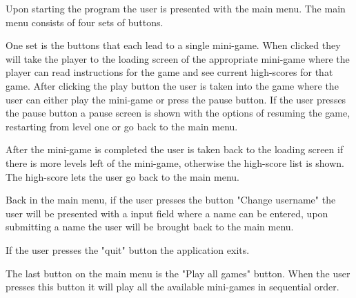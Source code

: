 Upon starting the program the user is presented with the main menu.
The main menu consists of four sets of buttons.

One set is the buttons that each lead to a single mini-game. 
When clicked they will take the player to the loading screen of the appropriate mini-game where the player can read instructions for the game and see current high-scores for that game.
After clicking the play button the user is taken into the game where the user can either play the mini-game or press the pause button.
If the user presses the pause button a pause screen is shown with the options of resuming the game, restarting from level one or go back to the main menu.

After the mini-game is completed the user is taken back to the loading screen if there is more levels left of the mini-game, otherwise the high-score list is shown.
The high-score lets the user go back to the main menu.

Back in the main menu, if the user presses the button "Change username" the user will be presented with a input field where a name can be entered, upon submitting a name the user will be brought back to the main menu.

If the user presses the "quit" button the application exits.

The last button on the main menu is the "Play all games" button. When the user presses this button it will play all the available mini-games in sequential order.